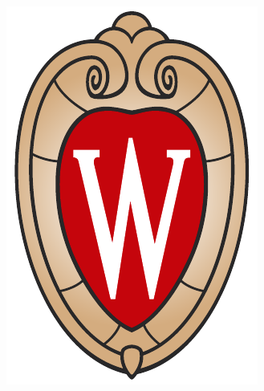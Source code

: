 \documentclass[aspectratio=169]{beamer}
\theoremstyle{remark}
\begin{document}
\begin{frame}
    \vfill
    \begin{columns}
        \begin{column}{0.33\textwidth}
            \centering
            \includegraphics[height=0.35\textheight]{./figures/uw-crest-color-web-digital.pdf}
            

\end{column}
\end{columns}
\end{frame}
\end{document}
